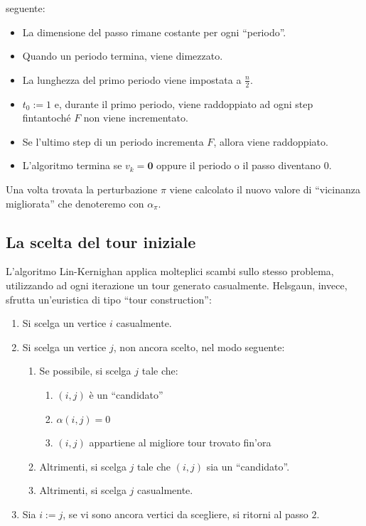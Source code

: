 seguente:
\begin{itemize}
    \item La dimensione del passo rimane costante per ogni ``periodo''.
    \item Quando un periodo termina, viene dimezzato.
    \item La lunghezza del primo periodo viene impostata a $\frac{n}{2}$.
    \item $t_0 := 1$ e, durante il primo periodo, viene raddoppiato ad ogni step fintantoché $F$ non 
            viene incrementato.
    \item Se l'ultimo step di un periodo incrementa $F$, allora viene raddoppiato.
    \item L'algoritmo termina se $v_k = \mathbf{0}$ oppure il periodo o il passo diventano 0.
\end{itemize}

Una volta trovata la perturbazione $\pi$ viene calcolato il nuovo valore di ``vicinanza migliorata'' che 
denoteremo con $\alpha_{\pi}$.

\subsection{La scelta del tour iniziale}

L'algoritmo Lin-Kernighan applica molteplici scambi sullo stesso problema, utilizzando ad ogni 
iterazione un tour generato casualmente. Helsgaun, invece, sfrutta un'euristica di tipo 
``tour construction'':
\begin{algorithm}[H]
\caption{}
\begin{enumerate}
    \item Si scelga un vertice $i$ casualmente.
    \item Si scelga un vertice $j$, non ancora scelto, nel modo seguente:
    \begin{enumerate}
        \item Se possibile, si scelga $j$ tale che:
        \begin{enumerate}
            \item $(i,j)$ è un ``candidato''
            \item $\alpha(i,j)=0$
            \item $(i,j)$ appartiene al migliore tour trovato fin'ora
        \end{enumerate}
        \item Altrimenti, si scelga $j$ tale che $(i,j)$ sia un ``candidato''.
        \item Altrimenti, si scelga $j$ casualmente.
    \end{enumerate}
    \item Sia $i:=j$, se vi sono ancora vertici da scegliere, si ritorni al passo $2$.
\end{enumerate}
\end{algorithm}